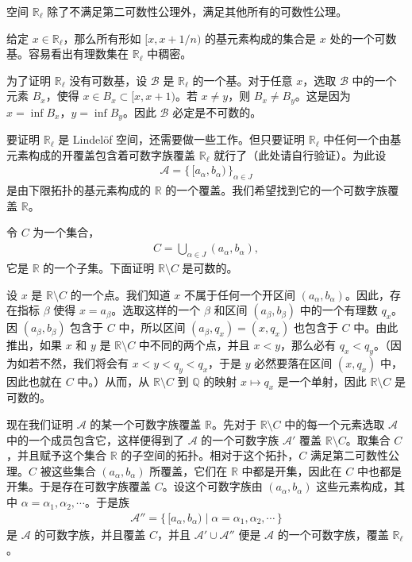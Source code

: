 \begin{example}\label{example:ch04-sorgenfrey-line-countability}
空间 $\mathbb{R}_{\ell}$ 除了不满足第二可数性公理外，满足其他所有的可数性公理。

给定 $x\in\mathbb{R}_{\ell}$，那么所有形如 $[x,x+1/n)$ 的基元素构成的集合是 $x$ 处的一个可数基。容易看出有理数集在 $\mathbb{R}_{\ell}$ 中稠密。

为了证明 $\mathbb{R}_{\ell}$ 没有可数基，设 $\mathcal{B}$ 是 $\mathbb{R}_{\ell}$ 的一个基。对于任意 $x$，选取 $\mathcal{B}$ 中的一个元素 $B_{x}$，使得 $x\in B_{x}\subset[x,x+1)$。若 $x\neq y$，则 $B_{x}\neq B_{y}$。这是因为 $x=\inf B_{x}$，$y=\inf B_{y}$。因此 $\mathcal{B}$ 必定是不可数的。

要证明 $\mathbb{R}_{\ell}$ 是 Lindelöf 空间，还需要做一些工作。但只要证明 $\mathbb{R}_{\ell}$ 中任何一个由基元素构成的开覆盖包含着可数字族覆盖 $\mathbb{R}_{\ell}$ 就行了（此处请自行验证）。为此设
\begin{align*}
\mathcal{A}=\{\,[a_{\alpha},b_{\alpha})\,\}_{\alpha\in J}
\end{align*}
是由下限拓扑的基元素构成的 $\mathbb{R}$ 的一个覆盖。我们希望找到它的一个可数字族覆盖 $\mathbb{R}$。

令 $C$ 为一个集合，
\begin{align*}
C=\bigcup_{\alpha\in J}(a_{\alpha},b_{\alpha}),
\end{align*}
它是 $\mathbb{R}$ 的一个子集。下面证明 $\mathbb{R}\setminus C$ 是可数的。

设 $x$ 是 $\mathbb{R}\setminus C$ 的一个点。我们知道 $x$ 不属于任何一个开区间 $(a_{\alpha},b_{\alpha})$。因此，存在指标 $\beta$ 使得 $x=a_{\beta}$。选取这样的一个 $\beta$ 和区间 $(a_{\beta},b_{\beta})$ 中的一个有理数 $q_{x}$。因 $(a_{\beta},b_{\beta})$ 包含于 $C$ 中，所以区间 $(a_{\beta},q_{x})=(x,q_{x})$ 也包含于 $C$ 中。由此推出，如果 $x$ 和 $y$ 是 $\mathbb{R}\setminus C$ 中不同的两个点，并且 $x<y$，那么必有 $q_{x}<q_{y}$。（因为如若不然，我们将会有 $x<y<q_{y}<q_{x}$，于是 $y$ 必然要落在区间 $(x,q_{x})$ 中，因此也就在 $C$ 中。）从而，从 $\mathbb{R}\setminus C$ 到 $\mathbb{Q}$ 的映射 $x\mapsto q_{x}$ 是一个单射，因此 $\mathbb{R}\setminus C$ 是可数的。

现在我们证明 $\mathcal{A}$ 的某一个可数字族覆盖 $\mathbb{R}$。先对于 $\mathbb{R}\setminus C$ 中的每一个元素选取 $\mathcal{A}$ 中的一个成员包含它，这样便得到了 $\mathcal{A}$ 的一个可数字族 $\mathcal{A}'$ 覆盖 $\mathbb{R}\setminus C$。取集合 $C$，并且赋予这个集合 $\mathbb{R}$ 的子空间的拓扑。相对于这个拓扑，$C$ 满足第二可数性公理。$C$ 被这些集合 $(a_{\alpha},b_{\alpha})$ 所覆盖，它们在 $\mathbb{R}$ 中都是开集，因此在 $C$ 中也都是开集。于是存在可数字族覆盖 $C$。设这个可数字族由 $(a_{\alpha},b_{\alpha})$ 这些元素构成，其中 $\alpha=\alpha_{1},\alpha_{2},\cdots$。于是族
\begin{align*}
\mathcal{A}''=\{\,[a_{\alpha},b_{\alpha})\mid\alpha=\alpha_{1},\alpha_{2},\cdots\,\}
\end{align*}
是 $\mathcal{A}$ 的可数字族，并且覆盖 $C$，并且 $\mathcal{A}'\cup\mathcal{A}''$ 便是 $\mathcal{A}$ 的一个可数字族，覆盖 $\mathbb{R}_{\ell}$。
\end{example}

